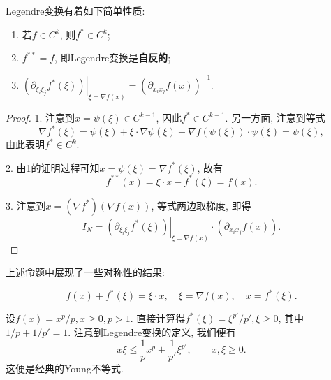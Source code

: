 \begin{proposition}
    Legendre变换有着如下简单性质:
    \begin{enumerate}
        \item 若$f \in C^k$, 则$f^* \in C^k$;
        \item $f^{**} = f$, 即Legendre变换是\textbf{自反的};
        \item $\left.(\partial_{\xi_i\xi_j}f^*(\xi))\right|_{\xi = \nabla f(x)} = (\partial_{x_ix_j}f(x))^{-1}$.
    \end{enumerate}
    \begin{proof}
        1. 注意到$x = \psi(\xi) \in C^{k - 1}$, 因此$f^* \in C^{k - 1}$. 另一方面, 注意到等式 
        \begin{equation*}
            \nabla f^*(\xi) = \psi(\xi) + \xi \cdot \nabla\psi(\xi) - \nabla f(\psi(\xi)) \cdot \psi(\xi) = \psi(\xi),
        \end{equation*}
        由此表明$f^* \in C^k$.

        2. 由1的证明过程可知$x = \psi(\xi) = \nabla f^*(\xi)$, 故有 
        \begin{equation*}
            f^{**}(x) = \xi \cdot x - f^*(\xi) = f(x).
        \end{equation*}

        3. 注意到$x = (\nabla f^*)(\nabla f(x))$, 等式两边取梯度, 即得 
        \begin{equation*}
            I_N = \left.(\partial_{\xi_i\xi_j}f^*(\xi))\right|_{\xi = \nabla f(x)} \cdot (\partial_{x_ix_j}f(x)).
        \end{equation*}
    \end{proof}
\end{proposition}

上述命题中展现了一些对称性的结果:

\begin{equation*}
    \boxed{f(x) + f^*(\xi) = \xi \cdot x, \quad \xi = \nabla f(x), \quad x = f^*(\xi).}
\end{equation*}

\begin{example}
    设$f(x) = x^p/p, x \geq 0, p > 1$. 直接计算得$f^*(\xi) = \xi^{p'}/p', \xi \geq 0$, 其中$1/p + 1/p' = 1$.
    注意到Legendre变换的定义, 我们便有 
    \begin{equation*}
        x\xi \leq \frac{1}{p}x^p + \frac{1}{p'}\xi^{p'}, \qquad x, \xi \geq 0.
    \end{equation*}
    这便是经典的Young不等式.
\end{example}

